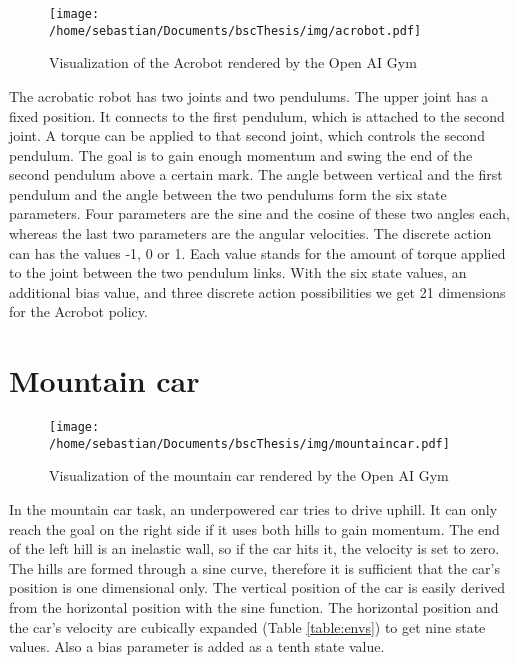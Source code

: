 \begin{figure}[h]
    \texttt{[image: /home/sebastian/Documents/bscThesis/img/acrobot.pdf]}
    \caption{Visualization of the Acrobot rendered by the Open AI Gym\label{fig:acrobotPygym}}
\end{figure}

The acrobatic robot has two joints and two pendulums. The upper joint has a fixed position. It connects to the first pendulum, which is attached to the second joint. A torque can be applied to that second joint, which controls the second pendulum. The goal is to gain enough momentum and swing the end of the second pendulum above a certain mark. The angle between vertical and the first pendulum and the angle between the two pendulums form the six state parameters. Four parameters are the sine and the cosine of these two angles each, whereas the last two parameters are the angular velocities. The discrete action can has the values -1, 0 or 1. Each value stands for the amount of torque applied to the joint between the two pendulum links. With the six state values, an additional bias value, and three discrete action possibilities we get 21 dimensions for the Acrobot policy.

\section{Mountain car}

\begin{wrapfigure}{R}{0.4\textwidth}
    \centering
    \texttt{[image: /home/sebastian/Documents/bscThesis/img/mountaincar.pdf]}
    \caption{Visualization of the mountain car rendered by the Open AI Gym\label{fig:mountaincarPygym}}
\end{wrapfigure}

In the mountain car task, an underpowered car tries to drive uphill. It can only reach the goal on the right side if it uses both hills to gain momentum. The end of the left hill is an inelastic wall, so if the car hits it, the velocity is set to zero. The hills are formed through a sine curve, therefore it is sufficient that the car's position is one dimensional only. The vertical position of the car is easily derived from the horizontal position with the sine function. The horizontal position and the car's velocity are cubically expanded (Table \ref{table:envs}) to get nine state values. Also a bias parameter is added as a tenth state value.


